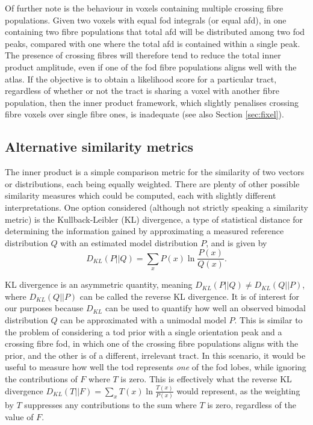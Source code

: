 \documentclass[12pt,phd,a4paper,twoside]{ucl_thesis}
\begin{document}
Of further note is the behaviour in voxels containing multiple crossing fibre populations.
Given two voxels with equal \gls{fod} integrals (or equal \gls{afd}), in one containing two fibre populations that total \gls{afd} will be distributed among two \gls{fod} peaks, compared with one where the total \gls{afd} is contained within a single peak.
The presence of crossing fibres will therefore tend to reduce the total inner product amplitude, even if one of the \gls{fod} fibre populations aligns well with the atlas.
If the objective is to obtain a likelihood score for a particular tract, regardless of whether or not the tract is sharing a voxel with another fibre population, then the inner product framework, which slightly penalises crossing fibre voxels over single fibre ones, is inadequate (see also Section \ref{sec:fixel}). 

\subsection{Alternative similarity metrics}

The inner product is a simple comparison metric for the similarity of two vectors or distributions, each being equally weighted.
There are plenty of other possible similarity measures which could be computed, each with slightly different interpretations.
One option considered (although not strictly speaking a similarity metric) is the Kullback-Leibler (KL) divergence, a type of statistical distance for determining the information gained by approximating a measured reference distribution $Q$ with an estimated model distribution $P$, and is given by
\begin{equation}
  D_{KL}(P||Q) = \sum_x P(x) \ln \frac{P(x)}{Q(x)}. \label{eq:kl}
\end{equation}

KL divergence is an asymmetric quantity, meaning $D_{KL}(P||Q) \neq D_{KL}(Q||P)$, where $D_{KL}(Q||P)$ can be called the reverse KL divergence.
It is of interest for our purposes because $D_{KL}$ can be used to quantify how well an observed bimodal distribution $Q$ can be approximated with a unimodal model $P$.
This is similar to the problem of considering a \gls{tod} prior with a single orientation peak and a crossing fibre \gls{fod}, in which one of the crossing fibre populations aligns with the prior, and the other is of a different, irrelevant tract.
In this scenario, it would be useful to measure how well the \gls{tod} represents \textit{one} of the \gls{fod} lobes, while ignoring the contributions of $F$ where $T$ is zero.
This is effectively what the reverse KL divergence $D_{KL}(T||F) = \sum_x T(x) \ln \frac{T(x)}{P(x)}$ would represent, as the weighting by $T$ suppresses any contributions to the sum where $T$ is zero, regardless of the value of $F$.
\end{document}
